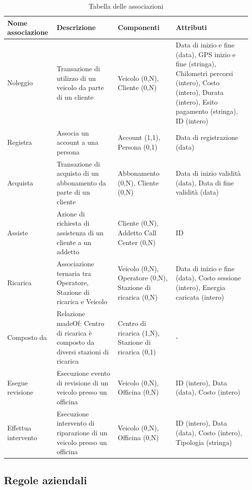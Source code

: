 \documentclass{article}
\begin{document}
\begin{table}[H]
\centering
\begin{tabularx}{\textwidth}{|X|X|X|X|}
\hline
\textbf{Nome associazione} & \textbf{Descrizione} & \textbf{Componenti} & \textbf{Attributi} \\ \hline
Noleggio & Transazione di utilizzo di un veicolo da parte di un cliente & Veicolo (0,N), Cliente (0,N) & Data di inizio e fine (data), GPS inizio e fine (stringa), Chilometri percorsi (intero), Costo (intero), Durata (intero), Esito pagamento (stringa), ID (intero) \\ \hline
Registra & Associa un account a una persona & Account (1,1), Persona (0,1) & Data di registrazione (data)\\ \hline
Acquista & Transazione di acquisto di un abbonamento da parte di un cliente & Abbonamento (0,N), Cliente (0,N) & Data di inizio validità (data), Data di fine validità (data) \\ \hline
Assiste & Azione di richiesta di assistenza di un cliente a un addetto & Cliente (0,N), Addetto Call Center (0,N)  & ID \\ \hline
Ricarica & Associazione ternaria tra Operatore, Stazione di ricarica e Veicolo & Veicolo (0,N), Operatore (0,N), Stazione di ricarica (0,N) & Data di inizio e fine (data), Costo sessione (intero), Energia caricata (intero) \\ \hline
Composto da & Relazione madeOf: Centro di ricarica è composto da diversi stazioni di ricarica & Centro di ricarica (1,N), Stazione di ricarica (0,1) & - \\ \hline
Esegue revisione & Esecuzione evento di revisione di un veicolo presso un officina & Veicolo (0,N), Officina (0,N) & ID (intero), Data (data), Costo (intero) \\ \hline
Effettua intervento & Esecuzione intervento di riparazione di un veicolo presso un officina & Veicolo (0,N), Officina (0,N) & ID (intero), Data (data), Costo (intero), Tipologia (stringa)  \\ \hline




\end{tabularx}
\caption{Tabella delle associazioni}
\label{table_glossario_termini}
\end{table}



\subsection{Regole aziendali}
\label{sec:regole-aziendali}
\end{document}
